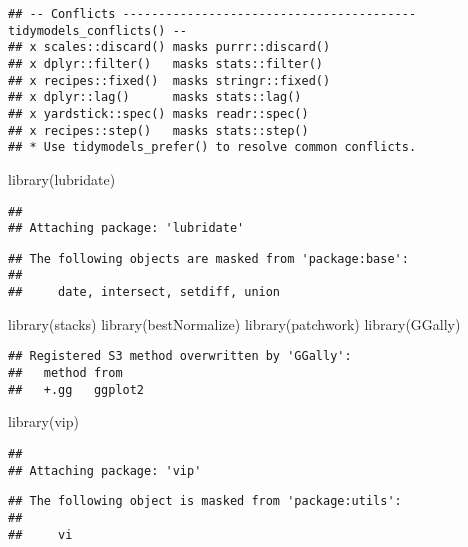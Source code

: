 \documentclass[
]{article}
\newenvironment{Shaded}{\begin{snugshade}}{\end{snugshade}}
\newcommand{\FunctionTok}[1]{\textcolor[rgb]{0.00,0.00,0.00}{#1}}
\newcommand{\NormalTok}[1]{#1}
\begin{document}
\begin{verbatim}
## -- Conflicts ----------------------------------------- tidymodels_conflicts() --
## x scales::discard() masks purrr::discard()
## x dplyr::filter()   masks stats::filter()
## x recipes::fixed()  masks stringr::fixed()
## x dplyr::lag()      masks stats::lag()
## x yardstick::spec() masks readr::spec()
## x recipes::step()   masks stats::step()
## * Use tidymodels_prefer() to resolve common conflicts.
\end{verbatim}

\begin{Shaded}
\begin{Highlighting}[]
\FunctionTok{library}\NormalTok{(lubridate)}
\end{Highlighting}
\end{Shaded}

\begin{verbatim}
## 
## Attaching package: 'lubridate'
\end{verbatim}

\begin{verbatim}
## The following objects are masked from 'package:base':
## 
##     date, intersect, setdiff, union
\end{verbatim}

\begin{Shaded}
\begin{Highlighting}[]
\FunctionTok{library}\NormalTok{(stacks)}
\FunctionTok{library}\NormalTok{(bestNormalize)}
\FunctionTok{library}\NormalTok{(patchwork)}
\FunctionTok{library}\NormalTok{(GGally)}
\end{Highlighting}
\end{Shaded}

\begin{verbatim}
## Registered S3 method overwritten by 'GGally':
##   method from   
##   +.gg   ggplot2
\end{verbatim}

\begin{Shaded}
\begin{Highlighting}[]
\FunctionTok{library}\NormalTok{(vip)}
\end{Highlighting}
\end{Shaded}

\begin{verbatim}
## 
## Attaching package: 'vip'
\end{verbatim}

\begin{verbatim}
## The following object is masked from 'package:utils':
## 
##     vi
\end{verbatim}
\end{document}
